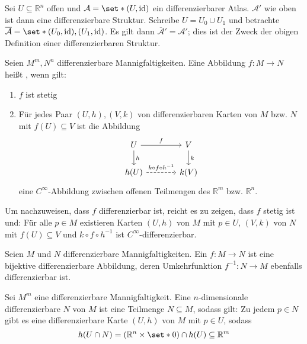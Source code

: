 \begin{beispiel}[{name=[Differenzierbare Struktur auf offener Teilmenge]}]
	Sei $U \subseteq \mathbb{R}^n$ offen und $\mathcal{A} = \set*{(U, {\id})}$ ein differenzierbarer Atlas.
	$\mathcal{A}'$ wie oben ist dann eine differenzierbare Struktur.
	Schreibe $U = U_0 \cup U_1$ und betrachte $\overline{\mathcal{A}} = \set*{(U_0,{\id}), (U_1,{\id})}$.
	Es gilt dann $\overline{\mathcal{A}}' = \mathcal{A}'$; dies ist der Zweck der obigen Definition einer differenzierbaren Struktur.
\end{beispiel}

\begin{definition}[{name=[differenzierbare Abbildung]}]
	Seien $M^m, N^n$ differenzierbare Mannigfaltigkeiten.
	Eine Abbildung $f \colon M \to N$ heißt , wenn gilt:
	\begin{enumerate}[1)]
		\item $f$ ist stetig
		\item Für jedes Paar $(U,h), (V,k)$ von differenzierbaren Karten von $M$ bzw. $N$ mit $f(U) \subseteq V$ ist die Abbildung
		\[
			\begin{tikzcd}[column sep=large]
				U \dar["h"] \rar["f"] & V \dar["k"]\\
				h(U) \rar[dashed,"k \circ f \circ h^{-1}"] & k(V)
			\end{tikzcd}
		\]
		eine $C^\infty$-Abbildung zwischen offenen Teilmengen des $\mathbb{R}^m$ bzw. $\mathbb{R}^n$.
	\end{enumerate} 
\end{definition}

\begin{bemerkung}
	Um nachzuweisen, dass $f$ differenzierbar ist, reicht es zu zeigen, dass $f$ stetig ist und: Für alle $p \in M$ existieren Karten $(U,h)$ von $M$ mit $p \in U$, $(V,k)$ von $N$ mit $f(U) \subseteq V$ und $k \circ f \circ h^{-1}$ ist $C^\infty$-differenzierbar. 
\end{bemerkung}

\begin{definition}[{name=[Diffeomorphismus]}]
	Seien $M$ und $N$ differenzierbare Mannigfaltigkeiten.
	Ein  $f \colon M \to N$ ist eine bijektive differenzierbare Abbildung, deren Umkehrfunktion $f^{-1} \colon N \to M$ ebenfalls differenzierbar ist.
\end{definition}

\begin{definition}[{name=[Untermannigfaltigkeit]}]
	Sei $M^m$ eine differenzierbare Mannigfaltigkeit.
	Eine $n$-dimensionale differenzierbare  $N$ von $M$ ist eine Teilmenge $N \subseteq M$, sodass gilt: Zu jedem $p \in N$ gibt es eine differenzierbare Karte $(U,h)$ von $M$ mit $p \in U$, sodass 
	\[
		h(U \cap N) = (\mathbb{R}^n \times \set*{0}) \cap h(U) \subseteq \mathbb{R}^m
	\]
\end{definition}

